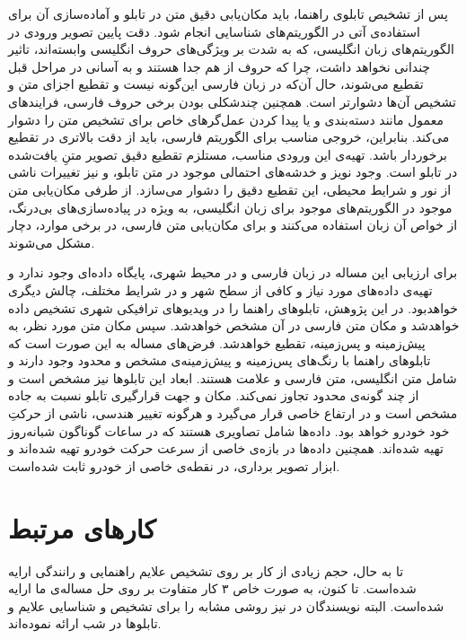 \documentclass[12pt,a4paper]{article}
\theoremstyle{definition}
\theoremstyle{theorem}
\theoremstyle{definition}
\begin{document}
پس از تشخیص تابلوی راهنما، باید مکان‌یابی دقیق متن در تابلو و آماده‌سازی آن برای استفاده‌ی آتی در الگوریتم‌های شناسایی انجام شود. دقت پایین تصویر ورودی در الگوریتم‌های  زبان انگلیسی، که به شدت بر ویژگی‌های حروف انگلیسی وابسته‌اند، تاثیر چندانی نخواهد داشت، چرا که حروف از هم جدا هستند و به آسانی در مراحل قبل تقطیع می‌شوند، حال آن‌که در زبان فارسی این‌گونه نیست و تقطیع اجزای متن و تشخیص آن‌ها دشوارتر است. همچنین چندشکلی بودن برخی حروف فارسی، فرایندهای معمول مانند دسته‌بندی و یا پیدا کردن عمل‌گرهای خاص برای تشخیص متن را دشوار می‌کند. بنابراین، خروجی مناسب برای الگوریتم  فارسی، باید از دقت بالاتری در تقطیع برخوردار باشد. تهیه‌ی این ورودی مناسب، مستلزم تقطیع دقیق تصویر متن‌ِ یافت‌شده در تابلو است. وجود نویز و خدشه‌های احتمالی موجود در متن تابلو، و نیز تغییرات ناشی از نور و شرایط محیطی، این تقطیع دقیق را دشوار می‌سازد. از طرفی مکان‌یابی متن موجود در الگوریتم‌های موجود برای زبان انگلیسی، به ویژه در پیاده‌سازی‌های بی‌درنگ، از خواص آن زبان استفاده می‌کنند و برای مکان‌یابی متن فارسی، در برخی موارد، دچار مشکل می‌شوند. 

برای ارزیابی این مساله در زبان فارسی و در محیط شهری، پایگاه داده‌ای وجود ندارد و تهیه‌ی داده‌های مورد نیاز و کافی از سطح شهر و در شرایط مختلف، چالش دیگری خواهدبود.
در این پژوهش، تابلوهای راهنما را در ویدیوهای ترافیکی شهری تشخیص داده‌ خواهد‌شد و مکان متن فارسی در آن مشخص خواهد‌شد. سپس مکان متن مورد نظر، به پیش‌زمینه و پس‌زمینه، تقطیع خواهدشد. 
فرض‌های مساله به این صورت است که تابلوهای راهنما با رنگ‌های پس‌زمینه و پیش‌زمینه‌ی مشخص و محدود وجود دارند و شامل متن انگلیسی، متن فارسی و علامت هستند. ابعاد این تابلوها نیز مشخص است و از چند گونه‌ی محدود تجاوز نمی‌کند. مکان و جهت قرارگیری تابلو نسبت به جاده مشخص است و در ارتفاع خاصی قرار می‌گیرد و هرگونه تغییر هندسی، ناشی از حرکتِ خود خودرو خواهد بود. داده‌ها شامل تصاویری هستند که در ساعات گوناگون شبانه‌روز تهیه شده‌اند. همچنین داده‌ها در بازه‌ی خاصی از سرعت حرکت خودرو تهیه شده‌اند و ابزار تصویر برداری، در نقطه‌ی خاصی از خودرو ثابت شده‌است. 


\section{کارهای مرتبط} 
تا به حال، حجم زیادی از کار بر روی تشخیص علایم راهنمایی و رانندگی ارایه شده‌است\cite{survey}. تا کنون، به صورت خاص ۳ کار متفاوت بر روی حل مساله‌ی ما ارایه شده‌است. البته نویسندگان \cite{gonzalez1} در \cite{gonzalez2} نیز روشی مشابه را برای تشخیص و شناسایی علایم و تابلوها در شب ارائه نموده‌اند.
\end{document}
